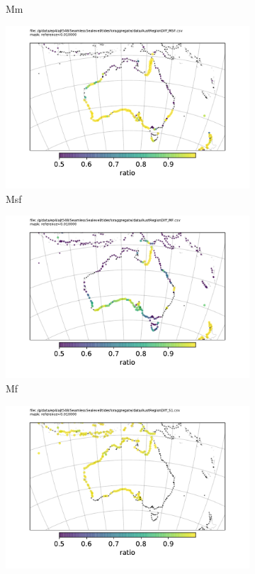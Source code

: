 \begin{figure}[h]
\begin{subfigure}[b]{\figwidthHalf}
        \caption{Mm}
    \end{subfigure}
    \begin{subfigure}[b]{\figwidthHalf}
        \includegraphics[width=\textwidth]{figures/maps/AustRegionDiff_MSF.pdf}
        \caption{Msf}
    \end{subfigure}
    \begin{subfigure}[b]{\figwidthHalf}
        \includegraphics[width=\textwidth]{figures/maps/AustRegionDiff_MF.pdf}
        \caption{Mf}
    \end{subfigure}
    \begin{subfigure}[b]{\figwidthHalf}
        \includegraphics[width=\textwidth]{figures/maps/AustRegionDiff_S1.pdf}

\end{subfigure}
\end{figure}
